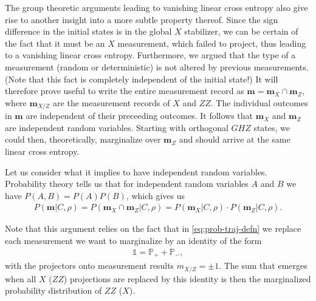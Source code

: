 The group theoretic arguments leading to vanishing linear cross entropy also
give rise to another insight into a more subtle property thereof. Since the
sign difference in the initial states is in the global $X$ stabilizer, we can
be certain of the fact that it must be an $X$ measurement, which failed to
project, thus leading to a vanishing linear cross entropy. Furthermore, we
argued that the type of a measurement (random or deterministic) is not altered
by previous measurements. (Note that this fact is completely independent of the
initial state!)
It will therefore prove useful to write the entire
measurement record as $\mathbf{m} = \mathbf{m}_X \cap \mathbf{m}_Z$, where
$\mathbf{m}_{X/Z}$ are the measurement records of $X$ and $ZZ$. The individual
outcomes in $\mathbf{m}$ are independent of their preceeding outcomes. It
follows that $\mathbf{m}_X$ and $\mathbf{m}_Z$ are independent random variables. 
Starting with orthogonal $GHZ$ states, we
could then, theoretically, marginalize over $\mathbf{m}_Z$ and should arrive at
the same linear cross entropy.

Let us consider what it implies to have independent random
variables.
Probability theory tells us that for independent random variables $A$ and $B$
we have $P(A, B) = P(A)P(B)$, which gives us
\begin{align}
      P(\mathbf{m} | C, \rho) = P(\mathbf{m}_X \cap \mathbf{m}_Z | C, \rho) =
    P(\mathbf{m}_X | C, \rho)\cdot P(\mathbf{m}_Z | C, \rho)
.\end{align}

Note that this argument relies on the fact that in \cref{eq:prob-traj-defn} we replace each measurement we
want to marginalize by an identity of the form
\begin{align}
  \mathds{1} = \mathbb{P}_+ + \mathbb{P}_-
,\end{align}
with the projectors onto measurement results $m_{X /Z} = \pm 1$. The sum that
emerges when all $X$ ($ZZ$) projections are replaced by this identity is then
the marginalized probability distribution of $ZZ$ ($X$).

